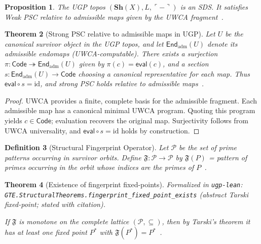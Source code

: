 \documentclass[12pt]{article}
\newtheorem{theorem}{Theorem}[section]
\newtheorem{proposition}[theorem]{Proposition}
\newtheorem{definition}[theorem]{Definition}
\numberwithin{equation}{section}
\begin{document}
\begin{proposition}\label{prop:ugp-sds}
The UGP topos $(\mathbf{Sh}(X), L, \ulcorner-\urcorner)$ is an SDS. It satisfies Weak PSC relative to admissible maps given by the UWCA fragment~\cite{SpivackUGPFormalization,ugp-lean}.
\end{proposition}

\begin{theorem}[Strong PSC relative to admissible maps in UGP]\label{thm:strong-psc-admissible}
Let $U$ be the canonical survivor object in the UGP topos, and let $\mathsf{End}_{\mathrm{adm}}(U)$ denote its admissible endomaps (UWCA-computable).
There exists a surjection $\pi: \mathsf{Code} \twoheadrightarrow \mathsf{End}_{\mathrm{adm}}(U)$ given by $\pi(c) = \mathsf{eval}(c)$, and a section $s: \mathsf{End}_{\mathrm{adm}}(U) \to \mathsf{Code}$ choosing a canonical representative for each map. Thus $\mathsf{eval} \circ s = \mathrm{id}$, and strong PSC holds relative to admissible maps~\cite{SpivackUGPFormalization,ugp-lean}.
\end{theorem}

\begin{proof}
UWCA provides a finite, complete basis for the admissible fragment. Each admissible map has a canonical minimal UWCA program. Quoting this program yields $c \in \mathsf{Code}$; evaluation recovers the original map. Surjectivity follows from UWCA universality, and $\mathsf{eval}\circ s=\mathrm{id}$ holds by construction.
\end{proof}

\begin{definition}[Structural Fingerprint Operator]\label{def:structural-fingerprint}
Let $\mathcal{P}$ be the set of prime patterns occurring in survivor orbits. Define $\mathfrak{F}: \mathcal{P} \to \mathcal{P}$ by $\mathfrak{F}(P)$ = pattern of primes occurring in the orbit whose indices are the primes of $P$~\cite{SpivackUGPFormalization,ugp-lean}.
\end{definition}

\begin{theorem}[Existence of fingerprint fixed-points]\label{thm:fingerprint-fixed-points}
\noindent\emph{Formalized in} \texttt{ugp-lean}: \texttt{GTE.StructuralTheorems.fingerprint\_fixed\_point\_exists} (abstract Tarski fixed-point; stated with citation).

If $\mathfrak{F}$ is monotone on the complete lattice $(\mathcal{P},\subseteq)$, then by Tarski's theorem it has at least one fixed point $P^*$ with $\mathfrak{F}(P^*) = P^*$~\cite{SpivackUGPFormalization,ugp-lean}.
\end{theorem}
\end{document}
